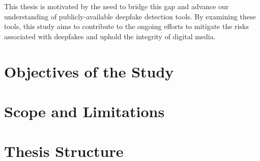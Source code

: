 This thesis is motivated by the need to bridge this gap and advance our understanding of
publicly-available deepfake detection tools. By examining these tools, this study aims to
contribute to the ongoing efforts to mitigate the risks associated with deepfakes and uphold
the integrity of digital media.


\section{Objectives of the Study}\label{chapter:objectives}
\section{Scope and Limitations}\label{chapter:scope}
\section{Thesis Structure}\label{chapter:structure}
